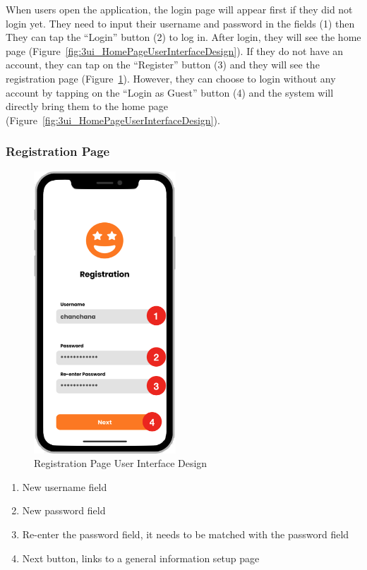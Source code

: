 \documentclass[12pt,oneside,openright,a4paper]{cpe-english-project}
\begin{document}
When users open the application, the login page will appear first if they did not login yet. They need to input their username and password in the fields (1) then They can tap the “Login” button (2) to log in. After login, they will see the home page (Figure~\ref{fig:3ui_HomePageUserInterfaceDesign}). If they do not have an account, they can tap on the “Register” button (3) and they will see the registration page (Figure~\ref{fig:3ui_RegistrationPageUserInterfaceDesign}). However, they can choose to login without any account by tapping on the “Login as Guest” button (4) and the system will directly bring them to the home page (Figure~\ref{fig:3ui_HomePageUserInterfaceDesign}).

\newpage
\subsubsection{Registration Page}
\begin{figure}[H]\centering
\includegraphics[height=300pt]{./images/3ui_RegistrationPageUserInterfaceDesign.png}
\caption{Registration Page User Interface Design}\label{fig:3ui_RegistrationPageUserInterfaceDesign}
\end{figure}\vspace{-24pt}

\begin{enumerate}
\item New username field
\item New password field
\item Re-enter the password field, it needs to be matched with the password field
\item Next button, links to a general information setup page
\end{enumerate}
\end{document}
